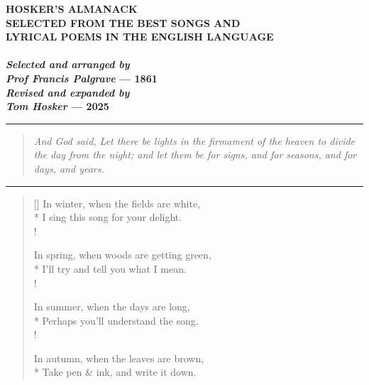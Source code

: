 \thispagestyle{empty}

\vspace*{\fill}

\begin{center}
    {\Huge \textbf{HOSKER'S ALMANACK}}\\
    {\large \textbf{SELECTED FROM THE BEST SONGS AND}}\\
    {\large \textbf{LYRICAL POEMS IN THE ENGLISH LANGUAGE}}\\
    \bigskip
    \bigskip
    \bigskip
    {\large {}}\\
    \bigskip
    \bigskip
    \bigskip
    {\large \textbf{\textit{Selected and arranged by}}}\\
    {\large \textbf{\textit{Prof Francis Palgrave} --- 1861}}\\
    \bigskip
    {\large \textbf{\textit{Revised and expanded by}}}\\
    {\large \textbf{\textit{Tom Hosker} --- 2025}}
\end{center}

\bigskip
\bigskip
\begin{center}
    \rule{0.5\textwidth}{0.5pt}
\end{center}
\bigskip
\bigskip

\begin{quote}
    \textit{And God said, Let there be lights in the firmament of the heaven to divide the day from the night; and let them be for signs, and for seasons, and for days, and years.}
\end{quote}

\bigskip
\bigskip
\begin{center}
    \rule{0.5\textwidth}{0.5pt}
\end{center}
\bigskip
\bigskip

\settowidth{\versewidth}{In winter, when the fields are white,}
\begin{verse}[\versewidth]
    In winter, when the fields are white,\\*
    I sing this song for your delight.\\!

    In spring, when woods are getting green,\\*
    I'll try and tell you what I mean.\\!

    In summer, when the days are long,\\*
    Perhaps you'll understand the song.\\!

    In autumn, when the leaves are brown,\\*
    Take pen \& ink, and write it down.
\end{verse}

